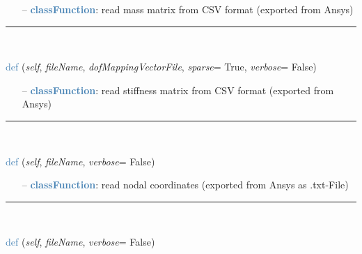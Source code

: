 \begin{itemize}[leftmargin=1.4cm]
\begin{itemize}[leftmargin=0.5cm]
\begin{itemize}[leftmargin=1.4cm]
\begin{itemize}[leftmargin=0.5cm]
\setlength{\itemindent}{0.7cm}
\begin{itemize}[leftmargin=0.7cm]
  \item[--]  \textcolor{steelblue}{\bf classFunction}: read mass matrix from CSV format (exported from Ansys)\vspace{12pt}\end{itemize}
%
\noindent\rule{8cm}{0.75pt}\vspace{1pt} \\ 
\begin{flushleft}
\noindent \textcolor{steelblue}{def {\bf {}}}\label{sec:FEM:FEMinterface:ReadStiffnessMatrixFromAnsys}
({\it self}, {\it fileName}, {\it dofMappingVectorFile}, {\it sparse}= True, {\it verbose}= False)
\end{flushleft}
\setlength{\itemindent}{0.7cm}
\begin{itemize}[leftmargin=0.7cm]
  \item[--]  \textcolor{steelblue}{\bf classFunction}: read stiffness matrix from CSV format (exported from Ansys)\vspace{12pt}\end{itemize}
%
\noindent\rule{8cm}{0.75pt}\vspace{1pt} \\ 
\begin{flushleft}
\noindent \textcolor{steelblue}{def {\bf {}}}\label{sec:FEM:FEMinterface:ReadNodalCoordinatesFromAnsys}
({\it self}, {\it fileName}, {\it verbose}= False)
\end{flushleft}
\setlength{\itemindent}{0.7cm}
\begin{itemize}[leftmargin=0.7cm]
  \item[--]  \textcolor{steelblue}{\bf classFunction}: read nodal coordinates (exported from Ansys as .txt-File)\vspace{12pt}\end{itemize}
%
\noindent\rule{8cm}{0.75pt}\vspace{1pt} \\ 
\begin{flushleft}
\noindent \textcolor{steelblue}{def {\bf {}}}\label{sec:FEM:FEMinterface:ReadElementsFromAnsys}
({\it self}, {\it fileName}, {\it verbose}= False)

\end{flushleft}
\end{itemize}
\end{itemize}
\end{itemize}
\end{itemize}

